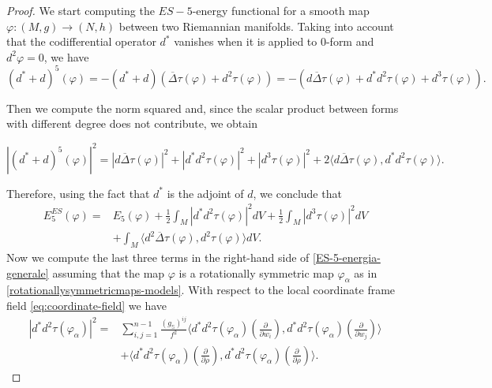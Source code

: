 \documentclass[11pt]{amsart}
\theoremstyle{plain}
\theoremstyle{definition}
\numberwithin{equation}{section}
\numberwithin{equation}{section}
\begin{document}
\begin{proof}
We start computing the $ES-5$-energy functional for a smooth map  $\varphi: (M,g) \to (N,h)$ between two Riemannian manifolds.
Taking into account that the codifferential operator $d^*$ vanishes when it is applied to $0$-form and $d^2 \varphi = 0$, we have 
\[
(d^*+d)^5 (\varphi) = -(d^*+d) (\overline{\Delta}\tau(\varphi) + d^2 \tau(\varphi)) = -(d\overline{\Delta}\tau(\varphi) + d^*d^2 \tau(\varphi)+d^3 \tau(\varphi)).
\]

Then we compute the norm squared and, since the scalar product between forms with different degree does not contribute, we obtain

\[
|(d^*+d)^5 (\varphi)|^2 = |d\overline{\Delta}\tau(\varphi)|^2 + |d^*d^2 \tau(\varphi)|^2 + |d^3 \tau(\varphi)|^2 + 2\langle d\overline{\Delta}\tau(\varphi), d^*d^2 \tau(\varphi)\rangle.
\]

Therefore, using the fact that $d^*$ is the adjoint of $d$, we conclude that
\begin{equation}\label{ES-5-energia-generale}
\begin{split}
E^{ES}_5(\varphi)= &E_5(\varphi) + \frac{1}{2}\int_{M}|d^*d^2 \tau(\varphi)|^2 dV + \frac{1}{2}\int_{M} |d^3 \tau(\varphi)|^2 dV\\
 &+ \int_{M}\langle d^2\overline{\Delta}\tau(\varphi), d^2 \tau(\varphi)\rangle dV.
\end{split}
\end{equation}
Now we compute the last three terms in the right-hand side of \eqref{ES-5-energia-generale} assuming that the map $\varphi$ is a rotationally symmetric map $\varphi_{\alpha}$ as in \eqref{rotationallysymmetricmaps-models}.
With respect to the local coordinate frame field \eqref{eq:coordinate-field}
 we have
\begin{equation}\label{expr-codif-d2tau-normsquared}
\begin{split}
|d^*d^2 \tau(\varphi_\alpha)|^2 = & \sum_{i,j=1}^{n-1}\frac{(g_\mathbb{S})^{ij}}{f^2}\langle d^*d^2 \tau(\varphi_\alpha) \left({\frac{\partial}{\partial w_i}}\right), d^*d^2 \tau(\varphi_\alpha)\left({\frac{\partial}{\partial w_j}}\right)\rangle\\
& + \langle d^*d^2 \tau(\varphi_\alpha)\left({\frac{\partial}{\partial \rho}}\right), d^*d^2 \tau(\varphi_\alpha)\left({\frac{\partial}{\partial \rho}}\right) \rangle. 
\end{split}
\end{equation}


\end{proof}
\end{document}
